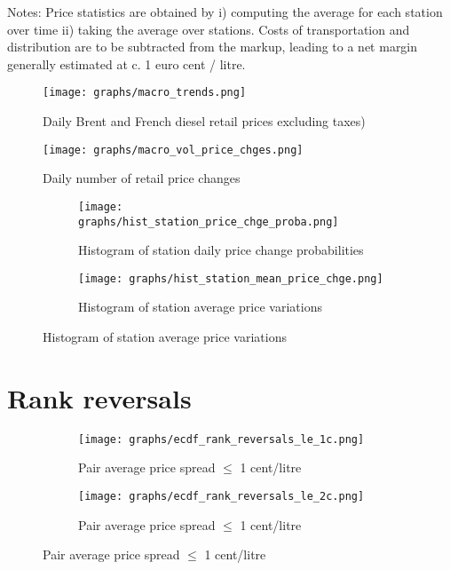 \documentclass[english]{article}
\begin{document}
{Notes: Price statistics are obtained by i) computing the average for each station over time ii) taking the average over stations. Costs of transportation and distribution are to be subtracted from the markup, leading to a net margin generally estimated at c. 1 euro cent / litre.

\newpage

\begin{figure}[!h]
    \caption{Daily Brent and French diesel retail prices excluding taxes)}
	\centering
		\texttt{[image: graphs/macro\_trends.png]}
\label{fig:macro_trends}
\end{figure}

\begin{figure}[!h]
    \caption{Daily number of retail price changes}
	\centering
		\texttt{[image: graphs/macro\_vol\_price\_chges.png]}
\label{fig:macro_vol_price_chges}
\end{figure}

\begin{figure}[H]
\centering
\caption{Price changes by station)}
\begin{subfigure}{.4\linewidth}
\centering
\texttt{[image: graphs/hist\_station\_price\_chge\_proba.png]}
\caption[short]{Histogram of station daily price change probabilities}
\label{fig:hist_station_price_chge_proba}
\end{subfigure}
\begin{subfigure}{.4\linewidth}
\centering
\texttt{[image: graphs/hist\_station\_mean\_price\_chge.png]}
\caption[short]{Histogram of station average price variations}
\label{fig:hist_station_mean_price_chge}
\end{subfigure}
\end{figure}

\newpage

\section{Rank reversals}

\begin{figure}[H]
\centering
\caption{Empirical distribution functions of rank reversals (raw prices)}
\begin{subfigure}{.4\linewidth}
\centering
\texttt{[image: graphs/ecdf\_rank\_reversals\_le\_1c.png]}
\caption[short]{Pair average price spread $\le$ 1 cent/litre}
\end{subfigure}
\begin{subfigure}{.4\linewidth}
\centering
\texttt{[image: graphs/ecdf\_rank\_reversals\_le\_2c.png]}
\caption[short]{Pair average price spread $\le$ 1 cent/litre}
\end{subfigure}
\end{figure}

}
\end{document}
